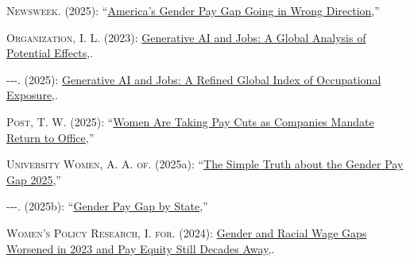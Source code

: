 \documentclass[
  letterpaper,
  DIV=11,
  numbers=noendperiod]{scrartcl}
\newlength{\cslhangindent}
\newenvironment{CSLReferences}[2] %
 {\begin{list}{}{%
  \setlength{\itemindent}{0pt}
  \setlength{\leftmargin}{0pt}
  \setlength{\parsep}{0pt}
  \ifodd #1
   \setlength{\leftmargin}{\cslhangindent}
   \setlength{\itemindent}{-1\cslhangindent}
  \fi
  \setlength{\itemsep}{#2\baselineskip}}}
 {\end{list}}
\begin{document}
\begin{CSLReferences}{1}{1}
\textsc{Newsweek}. (2025):
{``\href{https://www.newsweek.com/americas-gender-pay-gap-going-wrong-direction-10739408}{America's
Gender Pay Gap Going in Wrong Direction},''}

\textsc{Organization, I. L.} (2023):
\href{https://www.ilo.org/sites/default/files/wcmsp5/groups/public/\%40dgreports/\%40inst/documents/publication/wcms_890761.pdf}{Generative
AI and Jobs: A Global Analysis of Potential Effects},.

\textsc{-\/-\/-}. (2025):
\href{https://www.ilo.org/publications/generative-ai-and-jobs-refined-global-index-occupational-exposure}{Generative
AI and Jobs: A Refined Global Index of Occupational Exposure},.

\textsc{Post, T. W.} (2025):
{``\href{https://www.washingtonpost.com/business/2025/10/11/rto-mandates-gender-wage-gap/}{Women
Are Taking Pay Cuts as Companies Mandate Return to Office},''}

\textsc{University Women, A. A. of}. (2025a):
{``\href{https://www.aauw.org/resources/research/simple-truth/}{The
Simple Truth about the Gender Pay Gap 2025},''}

\textsc{-\/-\/-}. (2025b):
{``\href{https://www.aauw.org/resources/article/gender-pay-gap-by-state/}{Gender
Pay Gap by State},''}

\textsc{Women's Policy Research, I. for}. (2024):
\href{https://iwpr.org/wp-content/uploads/2024/09/IWPR-National-Wage-Gap-Fact-Sheet-2024.pdf}{Gender
and Racial Wage Gaps Worsened in 2023 and Pay Equity Still Decades
Away},.

\end{CSLReferences}
\end{document}
